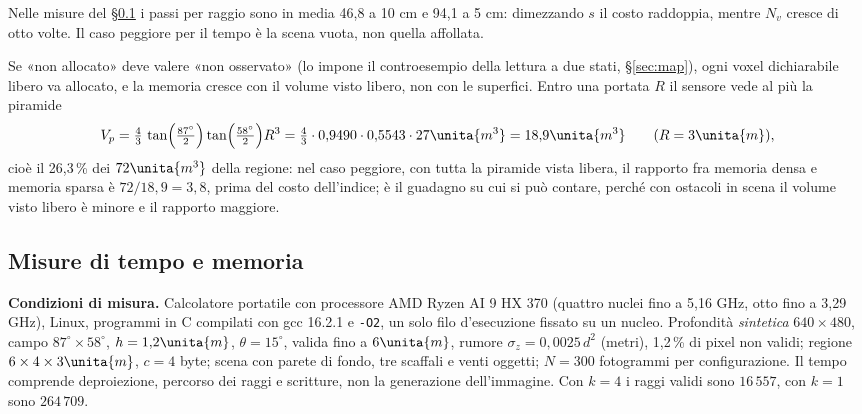 Nelle misure del \S\ref{sec:cos-misure} i passi per raggio sono in media 46,8 a 10 cm e 94,1 a 5 cm: dimezzando $s$ il costo raddoppia, mentre $N_v$ cresce di otto volte. Il caso peggiore per il tempo è la scena vuota, non quella affollata.

\begin{lemma}\label{lem:cos-sparsa}
Se «non allocato» deve valere «non osservato» (lo impone il controesempio della lettura a due stati, \S\ref{sec:map}), ogni voxel dichiarabile libero va allocato, e la memoria cresce con il volume visto libero, non con le superfici. Entro una portata $R$ il sensore vede al più la piramide
\begin{equation}\label{eq:cos-piramide}
V_p=\tfrac43\,\tan\!\Big(\tfrac{87^\circ}{2}\Big)\tan\!\Big(\tfrac{58^\circ}{2}\Big)R^3=\tfrac43\cdot0{,}9490\cdot0{,}5543\cdot27\unita{m^3}=18{,}9\unita{m^3}\qquad(R=3\unita{m}),
\end{equation}
cioè il 26,3\,\% dei $72\unita{m^3}$ della regione: nel caso peggiore, con tutta la piramide vista libera, il rapporto fra memoria densa e memoria sparsa è $72/18{,}9=3{,}8$, prima del costo dell'indice; è il guadagno su cui si può contare, perché con ostacoli in scena il volume visto libero è minore e il rapporto maggiore. 
\end{lemma}

\subsection{Misure di tempo e memoria}\label{sec:cos-misure}

\textbf{Condizioni di misura.} Calcolatore portatile con processore AMD Ryzen AI 9 HX 370 (quattro nuclei fino a 5,16 GHz, otto fino a 3,29 GHz), Linux, programmi in C compilati con gcc 16.2.1 e \texttt{-O2}, un solo filo d'esecuzione fissato su un nucleo. Profondità \emph{sintetica} $640\times480$, campo $87^\circ\times58^\circ$, $h=1{,}2\unita{m}$, $\theta=15^\circ$, valida fino a $6\unita{m}$, rumore $\sigma_z=0{,}0025\,d^2$ (metri), 1,2\,\% di pixel non validi; regione $6\times4\times3\unita{m}$, $c=4$ byte; scena con parete di fondo, tre scaffali e venti oggetti; $N=300$ fotogrammi per configurazione. Il tempo comprende deproiezione, percorso dei raggi e scritture, non la generazione dell'immagine. Con $k=4$ i raggi validi sono $16\,557$, con $k=1$ sono $264\,709$.

